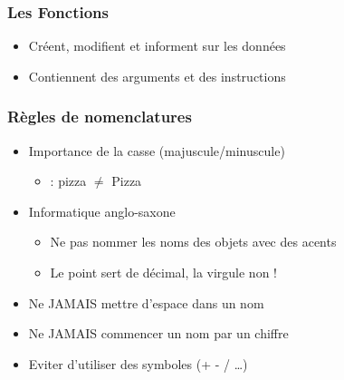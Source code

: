 \documentclass{beamer}
\begin{document}
\begin{frame}
	\frametitle{Les Fonctions}
	\begin{center}
		\begin{itemize}
			\item Créent, modifient et informent sur les données
			\item Contiennent des arguments et des instructions
		\end{itemize}
	\end{center}
\end{frame}
\begin{frame}
	\frametitle{Règles de nomenclatures}
	\begin{itemize}
		\item Importance de la casse (majuscule/minuscule)
			\begin{itemize}
				\item : pizza  $\neq$ Pizza
			\end{itemize}
		\item Informatique anglo-saxone
			\begin{itemize}
				\item Ne pas nommer les noms des objets avec des acents
				\item Le point sert de décimal, la virgule non !
			\end{itemize}
		\item Ne JAMAIS mettre d'espace dans un nom
		\item Ne JAMAIS commencer un nom par un chiffre
		\item Eviter d'utiliser des symboles (+ - / \dots)
	\end{itemize}
\end{frame}
\end{document}
